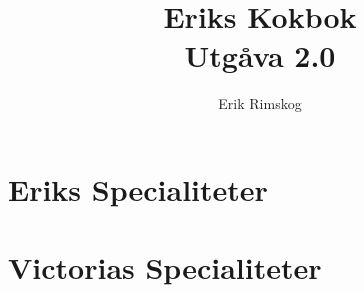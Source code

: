 \documentclass[12pt,a4paper]{article}
\title{\Huge Eriks Kokbok\\\medskip
  \large Utgåva 2.0\\\smallskip
  \small\texttt\shortHEAD}
\author{Erik Rimskog}
\begin{document}
\maketitle
\thispagestyle{empty}
\newpage
\tableofcontents
\newpage
\part{Eriks Specialiteter}



\part{Victorias Specialiteter}

\end{document}
